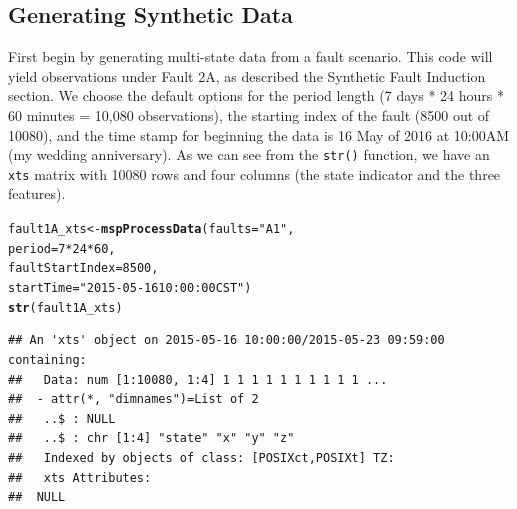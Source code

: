 \documentclass{report}\usepackage[]{graphicx}\usepackage[]{color}
\makeatletter
\newcommand{\hlnum}[1]{\textcolor[rgb]{0.686,0.059,0.569}{#1}}%
\newcommand{\hlstr}[1]{\textcolor[rgb]{0.192,0.494,0.8}{#1}}%
\newcommand{\hlopt}[1]{\textcolor[rgb]{0,0,0}{#1}}%
\newcommand{\hlstd}[1]{\textcolor[rgb]{0.345,0.345,0.345}{#1}}%
\newcommand{\hlkwb}[1]{\textcolor[rgb]{0.69,0.353,0.396}{#1}}%
\newcommand{\hlkwc}[1]{\textcolor[rgb]{0.333,0.667,0.333}{#1}}%
\newcommand{\hlkwd}[1]{\textcolor[rgb]{0.737,0.353,0.396}{\textbf{#1}}}%
\newenvironment{kframe}{%
 \def\at@end@of@kframe{}%
 \ifinner\ifhmode%
  \def\at@end@of@kframe{\end{minipage}}%
  \begin{minipage}{\columnwidth}%
 \fi\fi%
 \def\FrameCommand##1{\hskip\@totalleftmargin \hskip-\fboxsep
 \colorbox{shadecolor}{##1}\hskip-\fboxsep
     \hskip-\linewidth \hskip-\@totalleftmargin \hskip\columnwidth}%
 \MakeFramed {\advance\hsize-\width
   \@totalleftmargin\z@ \linewidth\hsize
   \@setminipage}}%
 {\par\unskip\endMakeFramed%
 \at@end@of@kframe}
\newenvironment{knitrout}{}{} %
\makeatother
\begin{document}
\subsection{Generating Synthetic Data}
First begin by generating multi-state data from a fault scenario. This code will yield observations under Fault 2A, as described the Synthetic Fault Induction section. We choose the default options for the period length (7 days * 24 hours * 60 minutes = 10,080 observations), the starting index of the fault (8500 out of 10080), and the time stamp for beginning the data is 16 May of 2016 at 10:00AM (my wedding anniversary). As we can see from the \texttt{str()} function, we have an \texttt{xts} matrix with 10080 rows and four columns (the state indicator and the three features).

\begin{knitrout}
\color{fgcolor}\begin{kframe}
\begin{alltt}
\hlstd{fault1A_xts} \hlkwb{<-} \hlkwd{mspProcessData}\hlstd{(}\hlkwc{faults} \hlstd{=} \hlstr{"A1"}\hlstd{,}
                              \hlkwc{period} \hlstd{=} \hlnum{7} \hlopt{*} \hlnum{24} \hlopt{*} \hlnum{60}\hlstd{,}
                              \hlkwc{faultStartIndex} \hlstd{=} \hlnum{8500}\hlstd{,}
                              \hlkwc{startTime} \hlstd{=} \hlstr{"2015-05-16 10:00:00 CST"}\hlstd{)}
\hlkwd{str}\hlstd{(fault1A_xts)}
\end{alltt}
\begin{verbatim}
## An 'xts' object on 2015-05-16 10:00:00/2015-05-23 09:59:00 containing:
##   Data: num [1:10080, 1:4] 1 1 1 1 1 1 1 1 1 1 ...
##  - attr(*, "dimnames")=List of 2
##   ..$ : NULL
##   ..$ : chr [1:4] "state" "x" "y" "z"
##   Indexed by objects of class: [POSIXct,POSIXt] TZ: 
##   xts Attributes:  
##  NULL
\end{verbatim}
\end{kframe}
\end{knitrout}
\end{document}
